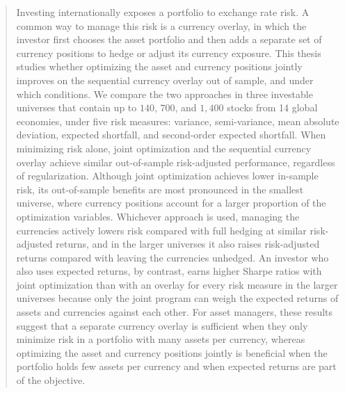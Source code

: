 \begin{abstract}
Investing internationally exposes a portfolio to exchange rate risk. A common way to manage this risk is a currency
overlay, in which the investor first chooses the asset portfolio and then adds a separate set of currency positions to
hedge or adjust its currency exposure. This thesis studies whether optimizing the asset and currency positions jointly
improves on the sequential currency overlay out of sample, and under which conditions. We compare the two approaches in 
three investable universes that contain up to $140$, $700$, and $1{,}400$ stocks
from 14 global economies, under five risk measures: variance, semi-variance, mean absolute deviation, expected
shortfall, and second-order expected shortfall.
When minimizing risk alone, joint optimization and the sequential currency overlay achieve similar out-of-sample risk-adjusted
performance, regardless of regularization. Although joint optimization achieves lower in-sample risk, its out-of-sample
benefits are most pronounced in the smallest universe, where currency positions account for a larger proportion of the optimization variables. 
Whichever approach is used, managing the currencies actively lowers risk compared with full hedging at similar
risk-adjusted returns, and in the larger universes it also raises risk-adjusted returns compared with leaving the
currencies unhedged. An investor who also uses expected returns, by contrast, earns higher Sharpe ratios with joint optimization than with
an overlay for every risk measure in the larger universes because only the joint program can weigh the expected
returns of assets and currencies against each other. For asset managers, these results 
suggest that a separate currency overlay is sufficient when they only minimize
risk in a portfolio with many assets per currency, whereas optimizing the asset and currency positions jointly is beneficial
when the portfolio holds few assets per currency and when expected returns are part of the objective.
 
\end{abstract}